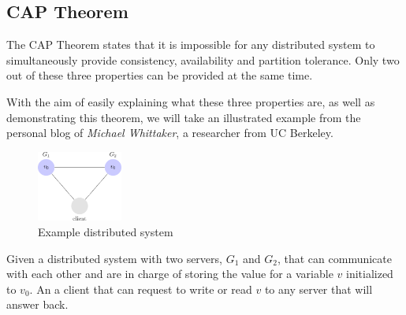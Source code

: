 \subsection{CAP Theorem}
The CAP Theorem states that it is impossible for any distributed system to simultaneously provide consistency, availability and partition tolerance. Only two out of these three properties can be provided at the same time\cite{wikipedia_cap}.

With the aim of easily explaining what these three properties are, as well as demonstrating this theorem, we will take an illustrated example\cite{cap-example} from the personal blog of \textit{Michael Whittaker}, a researcher from UC Berkeley.

\begin{figure}
\centering
    \includegraphics[width=0.25\textwidth]{assets/images/cap1.png}
    \caption{Example distributed system}
    \label{fig:dis-sys-1}
\end{figure}

Given a distributed system with two servers, $G_{1}$ and $G_{2}$, that can communicate with each other and are in charge of storing the value for a variable $v$ initialized to $v_{0}$. An a client that can request to write or read $v$ to any server that will answer back.


